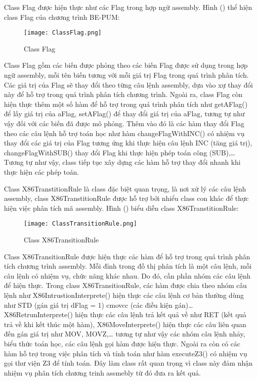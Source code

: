 	\newpage
	Class Flag được hiện thực như các Flag trong hợp ngữ assembly. Hình () thể hiện class Flag của chương trình BE-PUM:	
		\begin{center}
			\begin{figure}[htp]
				\begin{center}
					\texttt{[image: ClassFlag.png]}
				\end{center}
				\caption{Class Flag}	
					\label{fig:ClassFlag}		
			\end{figure}
		\end{center}			
	
Class Flag gồm các biến được phỏng theo các biến Flag được sử dụng trong hợp ngữ assembly, mỗi tên biến tương với mỗi giá trị Flag trong quá trình phân tích. Các giá trị của Flag sẽ thay đổi theo từng câu lệnh assembly, dựa vào xự thay đổi này để hỗ trợ trong quá trình phân tích chương trình. Ngoài ra, class Flag còn hiện thực thêm một số hàm để hỗ trợ trong quá trình phân tích như getAFlag() để lấy giá trị của aFlag, setAFlag() để thay đổi giá trị của aFlag, tương tự như vậy đối với các biến đã được mô phỏng. Thêm vào đó là các hàm thay đổi Flag theo các câu lệnh hỗ trợ toán học như hàm changeFlagWithINC() có nhiệm vụ thay đổi các giá trị của Flag tương ứng khi thực hiện câu lệnh INC (tăng giá trị), changeFlagWithSUB() thay đổi Flag khi thực hiện phép toán công (SUB),… Tương tự như vậy, class tiếp tục xây dựng các hàm hỗ trợ thay đổi nhanh khi thực hiện các phép toán.


	\newpage
	Class X86TranstitionRule là class đặc biệt quan trọng, là nơi xử lý các câu lệnh assembly, class X86TranstitionRule được hỗ trợ bởi nhiểu class con khác để thực hiện việc phân tích mã assembly. Hình () biểu diễn class X86TranstitionRule:
	\begin{center}
			\begin{figure}[htp]
				\begin{center}
					\texttt{[image: ClassTransitionRule.png]}
				\end{center}
				\caption{Class X86TransitionRule	}	
					\label{fig:ClassFlag}		
			\end{figure}
		\end{center}			
		
	Class X86TransitionRule được hiện thực các hàm để hỗ trợ trong quá trình phân tích chương trình assembly. Mỗi đỉnh trong đồ thị phân tích là một câu lệnh, mỗi câu lệnh có nhiệm vụ, chức năng khác nhau. Do đó, cần phần nhóm các câu lệnh để hiện thực. Trong class X86TransitionRule, các hàm được chia theo nhóm câu lệnh như X86IntrustionInterprete() hiện thực các câu lệnh cơ bản thường dùng như STD (gán giá trị dFlag = 1) cmovcc (các điều kiện gán)… X86RetrunInterprete() hiện thực các câu lệnh trả kết quả về như RET (kết quả trả về khi kết thúc một hàm), X86MoveInterprete() hiện thực các câu liên quan đến gán giá trị như MOV, MOVZ,… tương tự như vậy các nhóm câu lệnh nhảy, biểu thức toán học, các câu lệnh gọi hàm được hiện thực. Ngoài ra còn có các hàm hỗ trợ trong việc phân tích và tính toán như hàm executeZ3() có nhiệm vụ gọi thư viện Z3 để tính toán. Đây làm class rất quan trọng vì class này đảm nhận nhiệm vụ phân tích chương trinh assmebly từ đó đưa ra kết quả.
	
